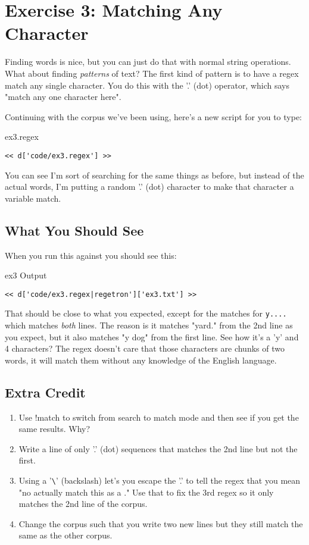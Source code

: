 \chapter{Exercise 3: Matching Any Character}

Finding words is nice, but you can just do that with normal
string operations.  What about finding \emph{patterns} of text?
The first kind of pattern is to have a regex match any single 
character.  You do this with the '.' (dot) operator, which
says "match any one character here".

Continuing with the corpus we've been using, here's
a new script for you to type:

\begin{code}{ex3.regex}
\begin{Verbatim}
<< d['code/ex3.regex'] >>
\end{Verbatim}
\end{code}

You can see I'm sort of searching for the same things as before, but instead
of the actual words, I'm putting a random '.' (dot) character to make that
character a variable match.

\section{What You Should See}

When you run this against  you should see this:

\begin{code}{ex3 Output}
\begin{Verbatim}
<< d['code/ex3.regex|regetron']['ex3.txt'] >>
\end{Verbatim}
\end{code}

That should be close to what you expected, except for the matches for
\verb|y....| which matches \emph{both} lines.  The reason is it matches
"yard." from the 2nd line as you expect, but it also matches "y dog"
from the first line.  See how it's a 'y' and 4 characters?  The regex
doesn't care that those characters are chunks of two words, it will match
them without any knowledge of the English language.


\section{Extra Credit}

\begin{enumerate}
\item Use !match to switch from search to match mode and then see if you
    get the same results.  Why?
\item Write a line of only '.' (dot) sequences that matches the 2nd line
    but not the first.
\item Using a '\verb|\|' (backslash) let's you escape the '.' to tell the regex
    that you mean "no actually match this as a ."  Use that to fix the
    3rd regex so it only matches the 2nd line of the corpus.
\item Change the corpus such that you write two new lines but they still
    match the same as the other corpus.
\end{enumerate}

